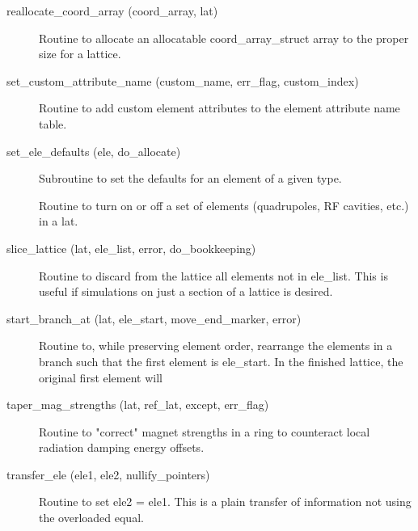 \begin{description}
\label{r:reallocate.coord.array}
\item[reallocate_coord_array (coord_array, lat)] \Newline 
Routine to allocate an allocatable coord_array_struct array to
the proper size for a lattice.

\label{r:set.custom.attribute.name}
\item[set_custom_attribute_name (custom_name, err_flag, custom_index)] \Newline 
Routine to add custom element attributes to the element attribute name table.

\label{r:set.ele.defaults}
\item[set_ele_defaults (ele, do_allocate)] \Newline 
Subroutine to set the defaults for an element of a given type.

\label{r:set.on.off}
\item[\protect\parbox{6in}{
    set_on_off (key, lat, switch, orb, use_ref_orb, ix_branch, saved_values, 
    \hspace*{1in} attribute, set_val) }] \Newline
Routine to turn on or off a set of elements (quadrupoles,
RF cavities, etc.) in a lat.

\label{r:slice.lattice}
\item[slice_lattice (lat, ele_list, error, do_bookkeeping)] \Newline 
Routine to discard from the lattice all elements not in ele_list.
This is useful if simulations on just a section of a lattice is desired.

\label{r:start.branch.at}
\item[start_branch_at (lat, ele_start, move_end_marker, error)] \Newline 
Routine to, while preserving element order, rearrange the elements in a branch such that 
the first element is ele_start. In the finished lattice, the original first element will

\label{r:taper.mag.strengths}
\item[taper_mag_strengths (lat, ref_lat, except, err_flag)] \Newline 
Routine to "correct" magnet strengths in a ring to counteract local radiation damping energy offsets.

\label{r:transfer.ele}
\item[transfer_ele (ele1, ele2, nullify_pointers)] \Newline 
     Routine to set ele2 = ele1. 
     This is a plain transfer of information not using the overloaded equal.


\end{description}
